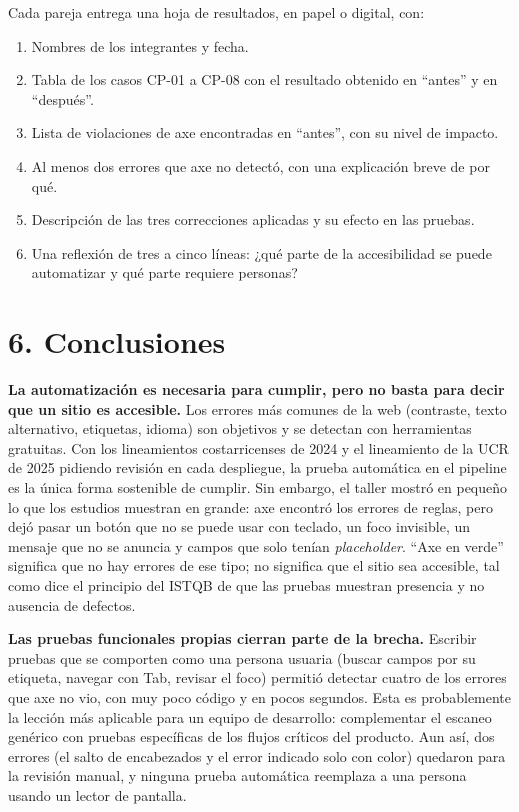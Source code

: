 \documentclass[10pt,letterpaper,onecolumn]{IEEEtran}
\begin{document}
Cada pareja entrega una hoja de resultados, en papel o digital, con:

\begin{enumerate}
\def\labelenumi{\arabic{enumi}.}
\item
  Nombres de los integrantes y fecha.
\item
  Tabla de los casos CP-01 a CP-08 con el resultado obtenido en ``antes'' y en ``después''.
\item
  Lista de violaciones de axe encontradas en ``antes'', con su nivel de impacto.
\item
  Al menos dos errores que axe no detectó, con una explicación breve de por qué.
\item
  Descripción de las tres correcciones aplicadas y su efecto en las pruebas.
\item
  Una reflexión de tres a cinco líneas: ¿qué parte de la accesibilidad se puede automatizar y qué parte requiere personas?
\end{enumerate}

\section{6. Conclusiones}\label{conclusiones}

\textbf{La automatización es necesaria para cumplir, pero no basta para decir que un sitio es accesible.} Los errores más comunes de la web (contraste, texto alternativo, etiquetas, idioma) son objetivos y se detectan con herramientas gratuitas. Con los lineamientos costarricenses de 2024 y el lineamiento de la UCR de 2025 pidiendo revisión en cada despliegue, la prueba automática en el pipeline es la única forma sostenible de cumplir. Sin embargo, el taller mostró en pequeño lo que los estudios muestran en grande: axe encontró los errores de reglas, pero dejó pasar un botón que no se puede usar con teclado, un foco invisible, un mensaje que no se anuncia y campos que solo tenían \emph{placeholder}. ``Axe en verde'' significa que no hay errores de ese tipo; no significa que el sitio sea accesible, tal como dice el principio del ISTQB de que las pruebas muestran presencia y no ausencia de defectos.

\textbf{Las pruebas funcionales propias cierran parte de la brecha.} Escribir pruebas que se comporten como una persona usuaria (buscar campos por su etiqueta, navegar con Tab, revisar el foco) permitió detectar cuatro de los errores que axe no vio, con muy poco código y en pocos segundos. Esta es probablemente la lección más aplicable para un equipo de desarrollo: complementar el escaneo genérico con pruebas específicas de los flujos críticos del producto. Aun así, dos errores (el salto de encabezados y el error indicado solo con color) quedaron para la revisión manual, y ninguna prueba automática reemplaza a una persona usando un lector de pantalla.
\end{document}
